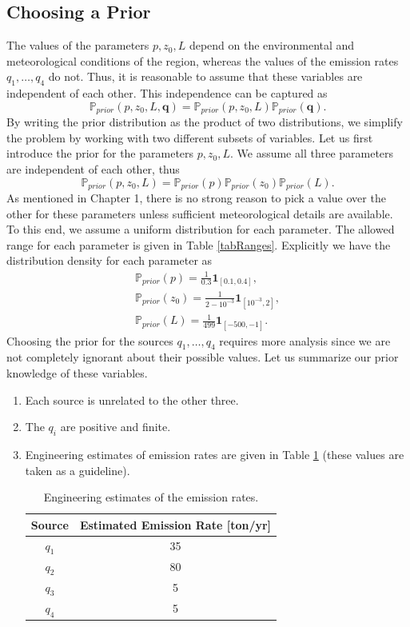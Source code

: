 \documentclass{sfuthesis}
\newcommand{\prior}{\mathbb{P}_{prior}}
\newcommand{\q}{\textbf{q}}
\newcommand{\pars}{p,z_{0},L}
\begin{document}
\subsection{Choosing a Prior}
The values of the  parameters $p,z_{0}, L$ depend on the environmental and meteorological conditions of the region, whereas
the values of the emission rates $q_{1},\ldots,q_{4}$ do not. Thus, it is reasonable
to assume that these  variables are independent
of each other. This independence can be captured  as
\begin{equation*} 
\prior(\pars,\q)=\prior(\pars)\prior(\q).
\end{equation*}
By writing the prior distribution as the product of two distributions, we 
simplify the problem by working with two different subsets of variables.
Let us first introduce the prior for the parameters $p,z_{0}, L$. 
We assume all three parameters are independent of each other, thus
\begin{equation*}
\prior(p,z_{0},L)=\prior(p)\prior(z_{0})\prior(L).
\end{equation*}
As mentioned in Chapter 1, there is no strong reason to pick a value over the other 
for these parameters unless sufficient meteorological details are available.
To this end, we assume a uniform
distribution for each parameter. The allowed range for each parameter is given
in Table \ref{tabRanges}. Explicitly we have the  distribution
density for each parameter as
\begin{eqnarray}\label{eqnPriorparam}
\prior(p)=\frac{1}{0.3}\textbf{1}_{[0.1,0.4]}\nonumber,\\
\prior(z_{0})=\frac{1}{2-10^{-3}}\textbf{1}_{[10^{-3},2]},\\
\prior(L)=\frac{1}{499}\textbf{1}_{[-500,-1]}\nonumber.
\end{eqnarray}
Choosing the prior for the sources $q_{1},\ldots,q_{4}$ requires more
analysis since we are not completely ignorant about their possible values. 
Let us summarize our prior knowledge of these variables.
\begin{enumerate}
\item Each source is unrelated to the other three.
\item The $q_{i}$ are positive and finite.
\item Engineering estimates of emission rates are given in Table \ref{tabSources} (these values are taken as a guideline).
\begin{table}[H]
\centering
\begin{tabular}{|c|c|}
\hline 
Source & Estimated Emission Rate {[}ton/yr{]}\tabularnewline
\hline 
\hline 
$q_{1}$ & 35\tabularnewline
\hline 
$q_{2}$ & 80\tabularnewline
\hline 
$q_{3}$ & 5\tabularnewline
\hline 
$q_{4}$ & 5\tabularnewline
\hline 
\end{tabular}
\caption{Engineering estimates of the emission rates.}
\label{tabSources}
\end{table}
\end{enumerate}
\end{document}
